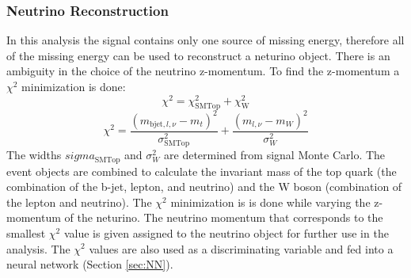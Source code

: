 \subsubsection{Neutrino Reconstruction}
In this analysis the signal contains only one source of missing energy, therefore all of the missing energy can be used to reconstruct a neturino object.  There is an ambiguity in the choice of the neutrino z-momentum.  To find the z-momentum a $\chi^2$ minimization is done:
\[ \chi^2 = \chi_{\text{SMTop}}^2 + \chi_{\text{W}}^2 \]
\[ \chi^2 = \frac{(m_{\text{bjet},l,\nu}-m_t)^2}{\sigma_{\text{SMTop}}^2} + \frac{(m_{l,\nu}-m_W)^2}{\sigma_W^2} \]
The widths $sigma_{\text{SMTop}}$ and $\sigma_W^2$ are determined from signal Monte Carlo.  The event objects are combined to calculate the invariant mass of the top quark (the combination of the b-jet, lepton, and neutrino) and the W boson (combination of the lepton and neutrino).  The $\chi^2$ minimization is is done while varying the z-momentum of the neturino.  The neutrino momentum that corresponds to the smallest $\chi^2$ value is given assigned to the neutrino object for further use in the analysis.  The $\chi^2$ values are also used as a discriminating variable and fed into a neural network (Section \ref{sec:NN}).







